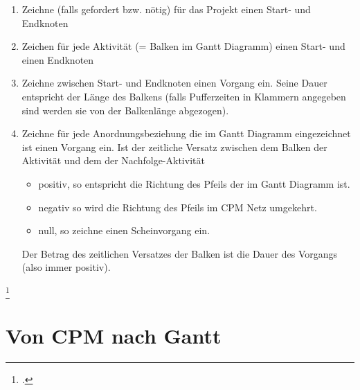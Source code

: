 \documentclass{lehramt-informatik-haupt}
\begin{document}
\begin{enumerate}

\item Zeichne (falls gefordert bzw. nötig) für das Projekt einen Start-
und Endknoten

\item Zeichen für jede Aktivität (= Balken im Gantt Diagramm) einen
Start- und einen Endknoten

\item Zeichne zwischen Start- und Endknoten einen Vorgang ein. Seine
Dauer entspricht der Länge des Balkens (falls Pufferzeiten in Klammern
angegeben sind werden sie von der Balkenlänge abgezogen).

\item Zeichne für jede Anordnungsbeziehung die im Gantt Diagramm
eingezeichnet ist einen Vorgang ein. Ist der zeitliche Versatz zwischen
dem Balken der Aktivität und dem der Nachfolge-Aktivität

\begin{itemize}
\item positiv, so entspricht die Richtung des Pfeils der im Gantt
Diagramm ist.

\item negativ so wird die Richtung des Pfeils im CPM Netz umgekehrt.

\item null, so zeichne einen Scheinvorgang ein.
\end{itemize}

Der Betrag des zeitlichen Versatzes der Balken ist die Dauer des
Vorgangs (also immer positiv).
\end{enumerate}

\footcite[Seite 35]{sosy:fs:3}

\section{Von CPM nach Gantt}
\end{document}
